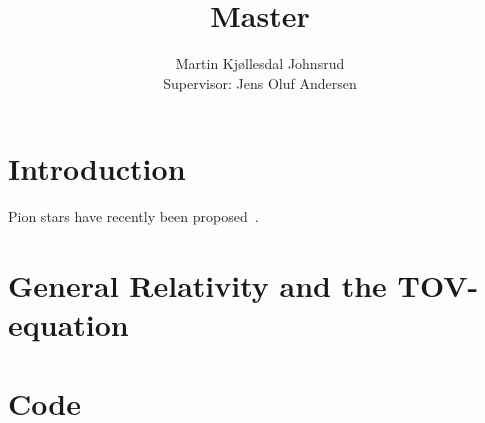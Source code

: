 \documentclass{book}
\title{\huge{Master}}
\author{
    \large{Martin Kjøllesdal Johnsrud }\\
    \normalsize{Supervisor: Jens Oluf Andersen}
    }
\begin{document}
    \maketitle
    \listoftodos
    \tableofcontents

    \chapter{Introduction}
    
    Pion stars have recently been proposed~\autocite{andersenBoseEinsteinCondensationPion2018,brandtNewClassCompact2018}.

    \chapter{General Relativity and the TOV-equation}
    
    
    

    \appendix
    
    \chapter{Code}

    

    \printbibliography
\end{document}
